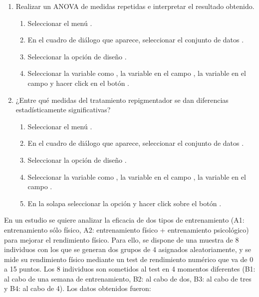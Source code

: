 \begin{enumerate}[leftmargin=*]
{\begin{center}
\begin{enumerate}
\item Realizar un ANOVA de medidas repetidas e interpretar el resultado obtenido.
\begin{indicacion}
\begin{enumerate}
\item Seleccionar el menú .
\item En el cuadro de diálogo que aparece, seleccionar el conjunto de datos .
\item Seleccionar la opción de diseño .
\item Seleccionar la variable  como , la variable 
en el campo , la variable  en el campo  y hacer click en el botón .
\end{enumerate}
\end{indicacion}

\item ¿Entre qué medidas del tratamiento repigmentador se dan diferencias estadísticamente significativas?
\begin{indicacion}
\begin{enumerate}
\item Seleccionar el menú .
\item En el cuadro de diálogo que aparece, seleccionar el conjunto de datos .
\item Seleccionar la opción de diseño .
\item Seleccionar la variable  como , la variable 
en el campo , la variable  en el campo .
\item En la solapa  seleccionar la opción  y hacer
click sobre el botón .
\end{enumerate}
\end{indicacion}
\end{enumerate}

\item En un estudio se quiere analizar la eficacia de dos tipos de entrenamiento (A1: entrenamiento sólo físico, A2:
entrenamiento físico + entrenamiento psicológico) para mejorar el rendimiento físico.
Para ello, se dispone de una muestra de 8 individuos con los que se generan dos grupos de 4 asignados aleatoriamente, y
se mide su rendimiento físico mediante un test de rendimiento numérico que va de 0 a 15 puntos.
Los 8 individuos son sometidos al test en 4 momentos diferentes (B1: al cabo de una semana de entrenamiento, B2: al cabo
de dos, B3: al cabo de tres y B4: al cabo de 4).
Los datos obtenidos fueron:


\end{center}}
\end{enumerate}
